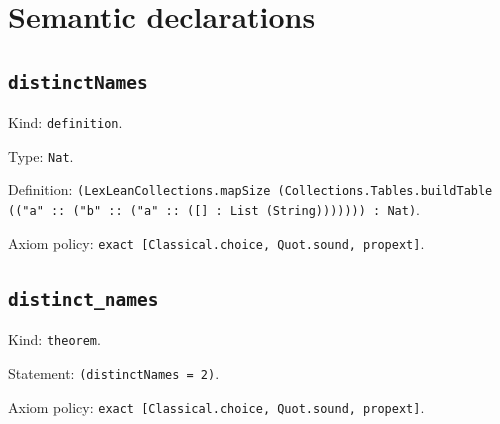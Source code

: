 \documentclass[11pt]{article}
\begin{document}
\section*{Semantic declarations}
\subsection*{\texttt{distinctNames}}
\noindent Kind: \texttt{definition}.\par
\noindent Type: \texttt{Nat}.\par
\noindent Definition: \texttt{(LexLeanCollections.mapSize (Collections.Tables.buildTable (("a" :: ("b" :: ("a" :: ([] : List (String))))))) : Nat)}.\par
\noindent Axiom policy: \texttt{exact [Classical.choice, Quot.sound, propext]}.\par
\subsection*{\texttt{distinct\_names}}
\noindent Kind: \texttt{theorem}.\par
\noindent Statement: \texttt{(distinctNames = 2)}.\par
\noindent Axiom policy: \texttt{exact [Classical.choice, Quot.sound, propext]}.\par
\end{document}
